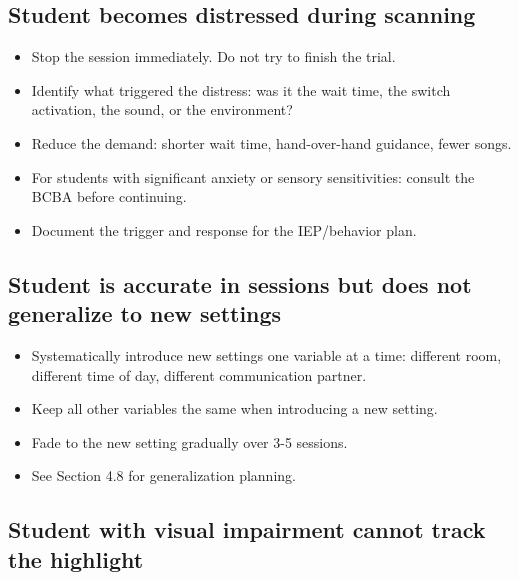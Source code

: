 \documentclass[justified,openright]{tufte-book}
\begin{document}
\subsection{Student becomes distressed during
scanning}\label{student-becomes-distressed-during-scanning}

\begin{itemize}

\item
  Stop the session immediately. Do not try to finish the trial.
\item
  Identify what triggered the distress: was it the wait time, the switch
  activation, the sound, or the environment?
\item
  Reduce the demand: shorter wait time, hand-over-hand guidance, fewer
  songs.
\item
  For students with significant anxiety or sensory sensitivities:
  consult the BCBA before continuing.
\item
  Document the trigger and response for the IEP/behavior plan.
\end{itemize}

\subsection{Student is accurate in sessions but does not generalize
to new
settings}\label{student-is-accurate-in-sessions-but-does-not-generalize-to-new-settings}

\begin{itemize}

\item
  Systematically introduce new settings one variable at a time:
  different room, different time of day, different communication
  partner.
\item
  Keep all other variables the same when introducing a new setting.
\item
  Fade to the new setting gradually over 3-5 sessions.
\item
  See Section 4.8 for generalization planning.
\end{itemize}

\subsection{Student with visual impairment cannot track the
highlight}\label{student-with-visual-impairment-cannot-track-the-highlight}
\end{document}
